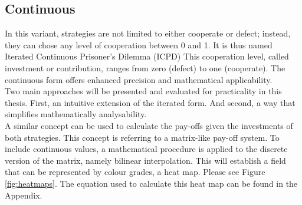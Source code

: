 \documentclass[11pt]{article}
\begin{document}
\subsection{Continuous}

In this variant, strategies are not limited to either cooperate or defect; instead, they can chose any level of cooperation between 0 and 1.
It is thus named Iterated Continuous Prisoner's Dilemma (ICPD)
This cooperation level, called investment or contribution, ranges from zero (defect) to one (cooperate).
The continuous form offers enhanced precision and mathematical applicability.\\
%

Two main approaches will be presented and evaluated for practicality in this thesis.
First, an intuitive extension of the iterated form. And second, a way that simplifies mathematically analysability.\\
A similar concept can be used to calculate the pay-offs given the investments of both strategies.
This concept is referring to a matrix-like pay-off system.
To include continuous values, a mathematical procedure is applied to the discrete version of the matrix, namely bilinear interpolation.
This will establish a field that can be represented by colour grades, a heat map.
Please see Figure \ref{fig:heatmaps}.
The equation used to calculate this heat map can be found in the Appendix.
\end{document}
